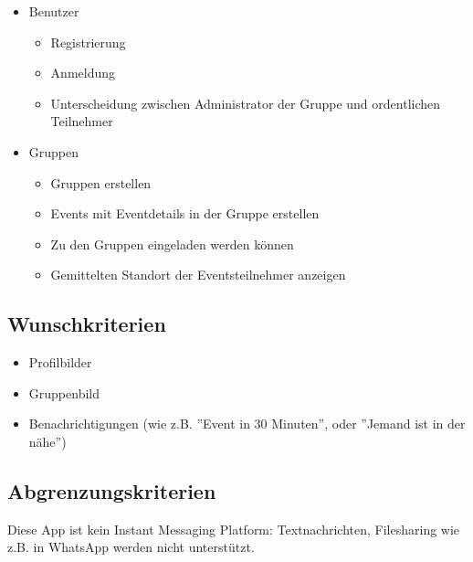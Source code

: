 \documentclass[parskip=full]{scrartcl}
\begin{document}
\begin{itemize}[itemsep=0pt]
	\item Benutzer  
	\begin{itemize}
	 	\item Registrierung
	 	\item Anmeldung
	 	\item Unterscheidung zwischen Administrator der Gruppe und ordentlichen Teilnehmer
	\end{itemize} 
	\item Gruppen
		\begin{itemize}
	 		\item Gruppen erstellen
	 		\item Events mit Eventdetails in der Gruppe erstellen 
	 		\item Zu den Gruppen eingeladen werden können
	 		\item Gemittelten Standort der Eventsteilnehmer anzeigen 
		\end{itemize}
\end{itemize}
	
\subsection{Wunschkriterien}
\begin{itemize}
	\item Profilbilder
	\item Gruppenbild
	\item Benachrichtigungen (wie z.B. ''Event in 30 Minuten'', oder ''Jemand ist in der nähe'')
\end{itemize}

\subsection{Abgrenzungskriterien}
Diese App ist kein Instant Messaging Platform: Textnachrichten, Filesharing wie z.B. in WhatsApp werden nicht unterstützt.
\end{document}
